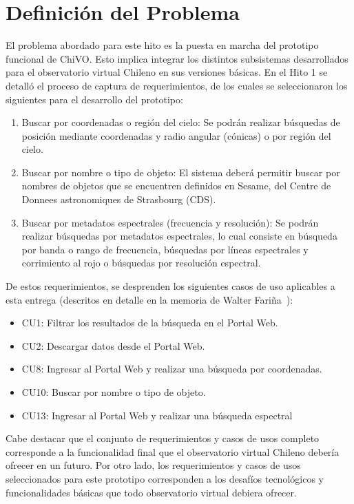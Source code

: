\section{Definición del Problema}

El problema abordado para este hito es la puesta en marcha
del prototipo funcional de ChiVO. Esto implica integrar los
distintos subsistemas desarrollados para el observatorio
virtual Chileno en sus versiones básicas. En el Hito 1 
se detalló el proceso de captura de requerimientos, de 
los cuales se seleccionaron los siguientes para el 
desarrollo del prototipo:

\begin{enumerate}
\item Buscar por coordenadas o región del cielo:
Se podrán realizar búsquedas de posición mediante coordenadas y radio angular
(cónicas) o por región del cielo.
\item Buscar por nombre o tipo de objeto:
El sistema deberá permitir buscar por nombres de objetos que se encuentren
definidos en Sesame, del Centre de Donnees astronomiques de Strasbourg (CDS).
\item Buscar por metadatos espectrales (frecuencia y resolución): 
Se podrán realizar búsquedas por metadatos espectrales, lo cual consiste en
búsqueda por banda o rango de frecuencia, búsquedas por líneas espectrales y 
corrimiento al rojo o búsquedas por resolución espectral.
\end{enumerate}

De estos requerimientos, se desprenden los siguientes casos 
de uso aplicables a esta entrega
(descritos en detalle en la memoria de Walter Fariña~\cite{wfar}):
\begin{itemize}
\item CU1: Filtrar los resultados de la búsqueda en el Portal Web.
\item CU2: Descargar datos desde el Portal Web.
\item CU8: Ingresar al Portal Web y realizar una búsqueda por coordenadas.
\item CU10: Buscar por nombre o tipo de objeto.
\item CU13: Ingresar al Portal Web y realizar una búsqueda espectral
\end{itemize}

Cabe destacar que el conjunto de requerimientos y casos de usos completo
corresponde a la funcionalidad final que el observatorio virtual Chileno
debería ofrecer en un futuro. Por otro lado, los requerimientos y casos de usos seleccionados
para este prototipo corresponden a los desafíos tecnológicos y funcionalidades
básicas que todo observatorio virtual debiera ofrecer.

